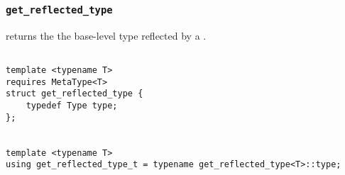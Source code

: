 
\subsubsection{\texttt{get\_reflected\_type}}

returns the the base-level type reflected by a .

\begin{verbatim}

template <typename T>
requires MetaType<T>
struct get_reflected_type {
	typedef Type type;
};


template <typename T>
using get_reflected_type_t = typename get_reflected_type<T>::type;

\end{verbatim}
